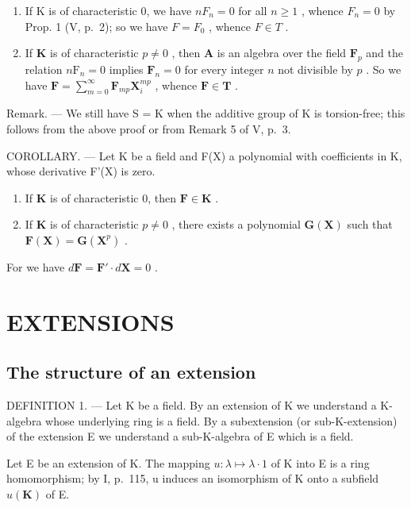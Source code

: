\begin{enumerate}
\def\labelenumi{\alph{enumi})}
\item
  If K is of characteristic 0, we have \(nF_{n} = 0\) for all \(n \geqslant 1\) , whence \(F_{n} = 0\) by Prop. 1 (V, p.~2); so we have \(F = F_{0}\) , whence \(F \in T\) .
\item
  If \(\mathbf{K}\) is of characteristic \(p \neq 0\) , then \(\mathbf{A}\) is an algebra over the field \(\mathbf{F}_p\) and the relation \(n\mathrm{F}_n = 0\) implies \(\mathbf{F}_n = 0\) for every integer \(n\) not divisible by \(p\) . So we have \(\mathbf{F} = \sum_{m=0}^{\infty} \mathbf{F}_{mp} \mathbf{X}_i^{mp}\) , whence \(\mathbf{F} \in \mathbf{T}\) .
\end{enumerate}

Remark. --- We still have S = K when the additive group of K is torsion-free; this follows from the above proof or from Remark 5 of V, p.~3.

COROLLARY. --- Let K be a field and F(X) a polynomial with coefficients in K, whose derivative F'(X) is zero.

\begin{enumerate}
\def\labelenumi{\alph{enumi})}
\item
  If \(\mathbf{K}\) is of characteristic 0, then \(\mathbf{F} \in \mathbf{K}\) .
\item
  If \(\mathbf{K}\) is of characteristic \(p \neq 0\) , there exists a polynomial \(\mathbf{G}(\mathbf{X})\) such that \(\mathbf{F}(\mathbf{X}) = \mathbf{G}(\mathbf{X}^p)\) .
\end{enumerate}

For we have \(d\mathbf{F} = \mathbf{F}' \cdot d\mathbf{X} = 0\) .

\section{EXTENSIONS}

\subsection{The structure of an extension}

DEFINITION 1. --- Let K be a field. By an extension of K we understand a K-algebra whose underlying ring is a field. By a subextension (or sub-K-extension) of the extension E we understand a sub-K-algebra of E which is a field.

Let E be an extension of K. The mapping \(u: \lambda \mapsto \lambda \cdot 1\) of K into E is a ring homomorphism; by I, p.~115, u induces an isomorphism of K onto a subfield \(u(\mathbf{K})\) of E.

